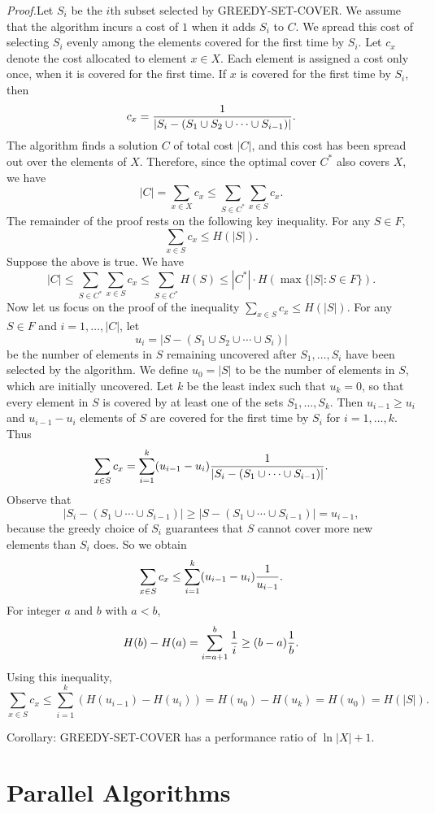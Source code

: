 \documentclass{article}
\begin{document}
\begin{itemize}
{\em Proof.}\quad Let $S_i$ be the $i$th subset selected by GREEDY-SET-COVER.
We assume that the algorithm incurs a cost of $1$ when it adds $S_i$ to $C$.
We spread this cost of selecting $S_i$ evenly among the elements covered for 
the first time by $S_i$. 
Let $c_x$ denote the cost allocated to element $x\in X$.
Each element is assigned a cost only once, when it is covered for the first
time. If $x$ is covered for the first time by $S_i$, then
$$c_x={1\over |S_i-(S_1\cup S_2\cup\cdots\cup S_{i-1})|}.$$
The algorithm finds a solution $C$ of total cost $|C|$, and this cost has
been spread out over the elements of $X$. Therefore, since the optimal
cover $C^*$ also covers $X$, we have
$$|C|=\sum_{x\in X}c_x\le\sum_{S\in C^*}\sum_{x\in S}c_x.$$
The remainder of the proof rests on the following key inequality.
For any $S\in F$,
$$\sum_{x\in S}c_x\le H(|S|).$$
Suppose the above is true. We have
$$|C|\le \sum_{S\in C^*}\sum_{x\in S}c_x\le \sum_{S\in C^*}H(S)
\le |C^*|\cdot H(\max\{|S|:S\in F\}).$$
Now let us focus on the proof of the inequality
$\sum_{x\in S}c_x\le H(|S|)$. For any $S\in F$ and $i=1,\ldots,|C|$,
let
$$u_i=|S-(S_1\cup S_2\cup\cdots\cup S_i)|$$
be the number of elements in $S$ remaining uncovered after
$S_1,\ldots,S_i$ have been selected by the algorithm. We define
$u_0=|S|$ to be the number of elements in $S$, which are initially
uncovered. Let $k$ be the least index such that $u_k=0$, so that
every element in $S$ is covered by at least one of the
sets $S_1,\ldots,S_k$. Then $u_{i-1}\ge u_i$ and $u_{i-1}-u_i$
elements of $S$ are covered for the first time by $S_i$ for
$i=1,\ldots,k$. Thus
$$\sum_{x\in S}c_x=\sum_{i=1}^k(u_{i-1}-u_i)
{1\over |S_i-(S_1\cup\cdots\cup S_{i-1})|}.$$
Observe that
$$|S_i-(S_1\cup\cdots\cup S_{i-1})|\ge|S-(S_1\cup\cdots\cup S_{i-1})|
=u_{i-1},$$
because the greedy choice of $S_i$ guarantees that $S$ cannot cover more
new elements than $S_i$ does. So we obtain
$$\sum_{x\in S}c_x\le\sum_{i=1}^k(u_{i-1}-u_i){1\over u_{i-1}}.$$
For integer $a$ and $b$ with $a<b$,
$$H(b)-H(a)=\sum_{i=a+1}^b{1\over i}\ge (b-a){1\over b}.$$
Using this inequality,
$$\sum_{x\in S}c_x\le\sum_{i=1}^k(H(u_{i-1})-H(u_i))
=H(u_0)-H(u_k)=H(u_0)=H(|S|).$$
                      
Corollary: GREEDY-SET-COVER has a performance ratio of
$\ln|X|+1$.

\end{itemize}

\newpage

\section{Parallel Algorithms}
\end{document}
